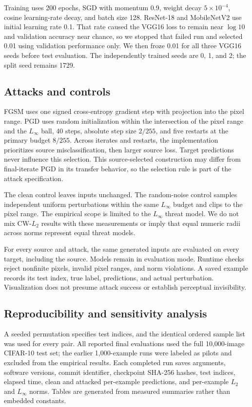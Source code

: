 \documentclass[10pt]{article}
\begin{document}
Training uses 200 epochs, SGD with momentum 0.9, weight decay $5\times10^{-4}$, cosine learning-rate decay, and batch size 128. ResNet-18 and MobileNetV2 use initial learning rate 0.1. That rate caused the VGG16 loss to remain near $\log 10$ and validation accuracy near chance, so we stopped that failed run and selected 0.01 using validation performance only. We then froze 0.01 for all three VGG16 seeds before test evaluation. The independently trained seeds are 0, 1, and 2; the split seed remains 1729.

\subsection{Attacks and controls}
FGSM uses one signed cross-entropy gradient step with projection into the pixel range. PGD uses random initialization within the intersection of the pixel range and the $L_\infty$ ball, 40 steps, absolute step size $2/255$, and five restarts at the primary budget $8/255$. Across iterates and restarts, the implementation prioritizes source misclassification, then larger source loss. Target predictions never influence this selection. This source-selected construction may differ from final-iterate PGD in its transfer behavior, so the selection rule is part of the attack specification.

The clean control leaves inputs unchanged. The random-noise control samples independent uniform perturbations within the same $L_\infty$ budget and clips to the pixel range. The empirical scope is limited to the $L_\infty$ threat model. We do not mix CW-$L_2$ results with these measurements or imply that equal numeric radii across norms represent equal threat models.

For every source and attack, the same generated inputs are evaluated on every target, including the source. Models remain in evaluation mode. Runtime checks reject nonfinite pixels, invalid pixel ranges, and norm violations. A saved example records its test index, true label, predictions, and actual perturbation. Visualization does not presume attack success or establish perceptual invisibility.

\subsection{Reproducibility and sensitivity analysis}
A seeded permutation specifies test indices, and the identical ordered sample list was used for every pair. All reported final evaluations used the full 10,000-image CIFAR-10 test set; the earlier 1,000-example runs were labeled as pilots and excluded from the empirical results. Each completed run saves arguments, software versions, commit identifier, checkpoint SHA-256 hashes, test indices, elapsed time, clean and attacked per-example predictions, and per-example $L_2$ and $L_\infty$ norms. Tables are generated from measured summaries rather than embedded constants.
\end{document}
